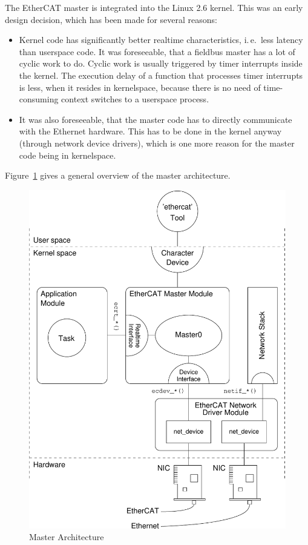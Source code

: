 \documentclass[a4paper,12pt,BCOR6mm,bibtotoc,idxtotoc]{scrbook}
\begin{document}
The EtherCAT master is integrated into the Linux 2.6 kernel. This was
an early design decision, which has been made for several reasons:

\begin{itemize}

\item Kernel code has significantly better realtime characteristics,
i.\,e.~less latency than userspace code. It was foreseeable, that a fieldbus
master has a lot of cyclic work to do. Cyclic work is usually triggered by
timer interrupts inside the kernel. The execution delay of a function that
processes timer interrupts is less, when it resides in kernelspace, because
there is no need of time-consuming context switches to a userspace process.

\item It was also foreseeable, that the master code has to directly
communicate with the Ethernet hardware. This has to be done in the kernel
anyway (through network device drivers), which is one more reason for the
master code being in kernelspace.

\end{itemize}

Figure~\ref{fig:arch} gives a general overview of the master architecture.

\begin{figure}[htbp]
  \centering
  \includegraphics[width=.9\textwidth]{images/architecture}
  \caption{Master Architecture}
  \label{fig:arch}
\end{figure}
\end{document}
